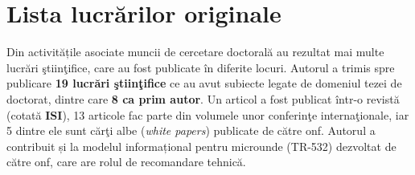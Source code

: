\section{Lista lucrărilor originale \label{sec:papers}}

Din activitățile asociate muncii de cercetare doctorală au rezultat mai multe lucrări ştiinţifice, care au fost publicate în diferite locuri. Autorul a trimis spre publicare \textbf{19 lucrări ştiinţifice} ce au avut subiecte legate de domeniul tezei de doctorat, dintre care \textbf{8 ca prim autor}. Un articol a fost publicat într-o revistă (cotată \textbf{ISI}), 13 articole fac parte din volumele unor conferinţe internaţionale, iar 5 dintre ele sunt cărţi albe (\textit{white papers}) publicate de către \gls{onf}. Autorul a contribuit și la modelul informațional pentru microunde (TR-532) dezvoltat de către \gls{onf}, care are rolul de recomandare tehnică.

